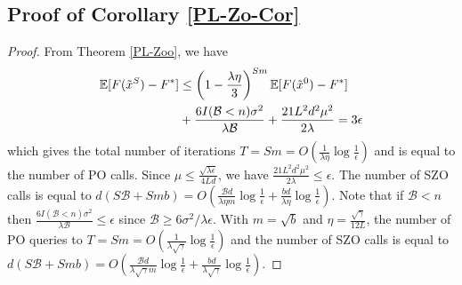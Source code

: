 \documentclass[iicol,sn-basic]{sn-jnl}
\theoremstyle{thmstyleone}%
\theoremstyle{thmstyletwo}%
\theoremstyle{thmstylethree}%
\newcommand*{\E}{\mathbb{E}}
\begin{document}
\noindent\subsection{Proof of Corollary \ref{PL-Zo-Cor}}
\begin{proof}
From Theorem \ref{PL-Zoo}, we have
\begin{align}
\E[F(\tilde{x}^S) - {F}^*] & \leq   \left(1-\frac{\lambda\eta}{3}\right)^{Sm} \E[F(\tilde{x}^0) - {F}^*] \notag\\
&+ \frac{6I(\mathcal{B} < n) \sigma ^2}{\lambda\mathcal{B}}+\frac{21 L^2 d^2 \mu^2}{2\lambda}= 3 \epsilon\notag
\end{align}
which gives the total number of iterations $T = Sm = O(\frac{1}{\lambda\eta}\log\frac{1}{\epsilon})$ and is equal to the number of PO calls. Since $\mu \leq \frac{\sqrt{\lambda\epsilon}}{4 L d}$, we have $\frac{21 L^2 d^2 \mu^2}{2\lambda} \leq \epsilon$. The number of SZO calls is equal to $d(S\mathcal{B}+Smb) = O(\frac{\mathcal{B}d}{\lambda\eta m}\log\frac{1}{\epsilon}+\frac{bd}{\lambda\eta}\log\frac{1}{\epsilon})$.  Note that if $\mathcal{B} < n$ then $\frac{6I(\mathcal{B} < n) \sigma ^2}{\lambda\mathcal{B}} \leq \epsilon$ since $\mathcal{B} \geq 6 {\sigma ^2}/{\lambda \epsilon}$. With $m=\sqrt{b}$ and $\eta = \frac{\sqrt{\gamma}}{12 L}$, the number of PO  queries to $T = Sm = O(\frac{1}{\lambda\sqrt{\gamma}}\log\frac{1}{\epsilon})$ and the number of SZO calls is equal to $d(S\mathcal{B}+Smb) = O(\frac{\mathcal{B}d}{\lambda\sqrt{\gamma} m}\log\frac{1}{\epsilon}+\frac{bd}{\lambda\sqrt{\gamma}}\log\frac{1}{\epsilon})$.
\end{proof}
\end{document}
